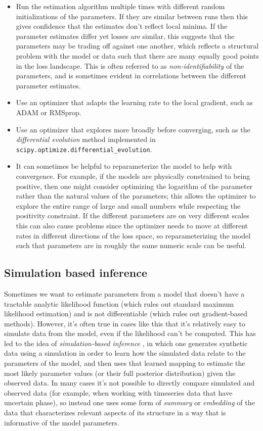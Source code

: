 \begin{itemize}
\item Run the estimation algorithm multiple times with different random initializations of the parameters. If they are similar between runs then this gives confidence that the estimates don't reflect local minima. If the parameter estimates differ yet losses are similar, this suggests that the parameters may be trading off against one another, which reflects a structural problem with the model or data such that there are many equally good points in the loss landscape. This is often referred to as \textit{non-identifiability} of the parameters, and is sometimes evident in correlations between the different parameter estimates.
\item Use an optimizer that adapts the learning rate to the local gradient, such as ADAM or RMSprop.
\item Use an optimizer that explores more broadly before converging, such as the \textit{differential evolution} method implemented in \texttt{scipy.optimize.differential\_evolution}.
\item It can sometimes be helpful to reparameterize the model to help with convergence.  For example, if the models are physically constrained to being positive, then one might consider optimizing the logarithm of the parameter rather than the natural values of the parameters; this allows the optimizer to explore the entire range of large and small numbers while respecting the positivity constraint.  If the different parameters are on very different scales this can also cause problems since the optimizer needs to move at different rates in different directions of the loss space, so reparameterizing the model such that parameters are in roughly the same numeric scale can be useful.
\end{itemize}

\subsection{Simulation based inference}

Sometimes we want to estimate parameters from a model that doesn't have a tractable analytic likelihood function (which rules out standard maximum likelihood estimation) and is not differentiable (which rules out gradient-based methods).  However, it's often true in cases like this that it's relatively easy to simulate data from the model, even if the likelihood can't be computed.  This has led to the idea of \textit{simulation-based inference} \citep{Cranmer:2020aa}, in which one generates synthetic data using a simulation in order to learn how the simulated data relate to the parameters of the model, and then uses that learned mapping to estimate the most likely parameter values (or their full posterior distribution) given the observed data.  In many cases it's not possible to directly compare simulated and observed data (for example, when working with timeseries data that have uncertain phase), so instead one uses some form of \textit{summary} or \textit{embedding} of the data that characterizes relevant aspects of its structure in a way that is informative of the model parameters.

